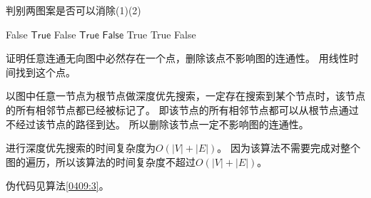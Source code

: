 \begin{questions}
    \begin{algorithm}
        \caption{判别两图案是否可以消除(1)(2)} \label{0409:2:12}
        \begin{algorithmic}[1]
             
            \State \Return \textsf{False}
            \EndIf
            \EndFor
            \State \Return $\mathsf{True}$
             
            \State \Return \textsf{False}
            \EndIf
            \EndFor
            \State \Return $\mathsf{True}$
            \Else {}
            \State \Return $\mathsf{False}$
            \EndIf
            \EndProcedure
            \Statex
            \State \Return \textsf{True}
            \State \Return \textsf{True}
            \EndIf
            \State \Return \textsf{False}
            \EndProcedure
        \end{algorithmic}
    \end{algorithm}

    \question 证明任意连通无向图中必然存在一个点，删除该点不影响图的连通性。
    用线性时间找到这个点。

    \begin{solution}
        以图中任意一节点为根节点做深度优先搜索，一定存在搜索到某个节点时，该节点的所有相邻节点都已经被标记了。
        即该节点的所有相邻节点都可以从根节点通过不经过该节点的路径到达。
        所以删除该节点一定不影响图的连通性。

        进行深度优先搜索的时间复杂度为$O(|V|+|E|)$。
        因为该算法不需要完成对整个图的遍历，所以该算法的时间复杂度不超过$O(|V|+|E|)$。

        伪代码见算法\ref{0409:3}。
    \end{solution}


\end{questions}
